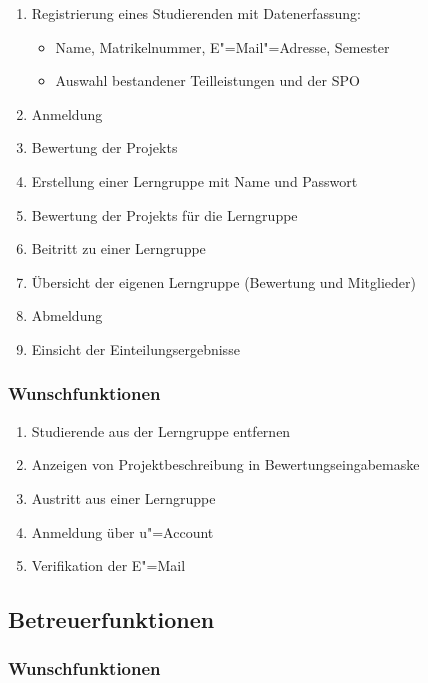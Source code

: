\documentclass[parskip=full]{scrartcl}
\newcommand{\swtLabel}[1]{\textbf{/#1\arabic*0/}}
\begin{document}
\begin{enumerate}[label=\swtLabel{FA}]
  \item Registrierung eines Studierenden mit Datenerfassung:
  \label{FAregistrierung}
  \begin{itemize}
    \item Name, Matrikelnummer, E"=Mail"=Adresse, Semester %
    \item Auswahl bestandener Teilleistungen und der \gls{SPO}
  \end{itemize}
  \item Anmeldung
  \item Bewertung der \glspl{Projekt} \label{FAbewertung}
  \item Erstellung einer Lerngruppe mit Name und Passwort
  \item Bewertung der \glspl{Projekt} für die Lerngruppe  \label{FAbewertung2}
  \item Beitritt zu einer Lerngruppe
  \item Übersicht der eigenen Lerngruppe (Bewertung und Mitglieder)
  \item Abmeldung
  \item Einsicht der Einteilungsergebnisse
\end{enumerate}

\subsubsection{Wunschfunktionen}

\begin{enumerate}[label=\swtLabel{FA}, resume]
	\item Studierende aus der Lerngruppe entfernen
	\item Anzeigen von Projektbeschreibung in Bewertungseingabemaske
	\item Austritt aus einer Lerngruppe
	\item Anmeldung über u"=Account %
	\item Verifikation der E"=Mail
\end{enumerate}

\subsection{Betreuerfunktionen}

\subsubsection{Wunschfunktionen}
\end{document}
